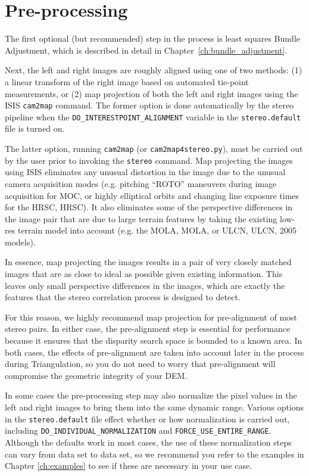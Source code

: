 \section{Pre-processing}

The first optional (but recommended) step in the process is least
squares Bundle Adjustment, which is described in detail in
Chapter~\ref{ch:bundle_adjustment}. 

Next, the left and right images are roughly aligned using one of
two methods: (1) a linear transform of the right image based on
automated tie-point measurements, or (2) map projection of both the
left and right images using the \ac{ISIS} \texttt{cam2map} command.  The
former option is done automatically by the stereo pipeline when the
\texttt{DO\_INTERESTPOINT\_ALIGNMENT} variable in the
\texttt{stereo.default} file is turned on.

The latter option, running {\tt cam2map} (or \texttt{cam2map4stereo.py}),
must be carried out by the user prior to invoking the {\tt stereo}
command.  Map projecting the images using \ac{ISIS} eliminates any
unusual distortion in the image due to the unusual camera acquisition
modes (e.g. pitching ``ROTO'' maneuvers during image acquisition
for \ac{MOC}, or highly elliptical orbits and changing line exposure
times for the \acl{HRSC}, \acs{HRSC}).  It also eliminates some of
the perspective differences in the image pair that are due to large
terrain features by taking the existing low-res terrain model into
account (e.g. the \acl{MOLA}, \acs{MOLA}, or \acl{ULCN}, \acs{ULCN},
2005 models).

In essence, map projecting the images results in a pair of very
closely matched images that are as close to ideal as possible given
existing information.  This leaves only small perspective differences
in the images, which are exactly the features that the stereo
correlation process is designed to detect.  

For this reason, we highly recommend map projection for pre-alignment
of most stereo pairs.  In either case, the pre-alignment step is
essential for performance because it ensures that the disparity search
space is bounded to a known area.  In both cases, the effects of
pre-alignment are taken into account later in the process during
Triangulation, so you do not need to worry that pre-alignment will
compromise the geometric integrity of your \ac{DEM}.

In some cases the pre-processing step may also normalize the pixel
values in the left and right images to bring them into the same
dynamic range.  Various options in the {\tt stereo.default} file
effect whether or how normalization is carried out, including
\texttt{DO\_INDIVIDUAL\_NORMALIZATION} and
\texttt{FORCE\_USE\_ENTIRE\_RANGE}.  Although the defaults work in
most cases, the use of these normalization steps can vary from data
set to data set, so we recommend you refer to the examples in Chapter
\ref{ch:examples} to see if these are necessary in your use case.

